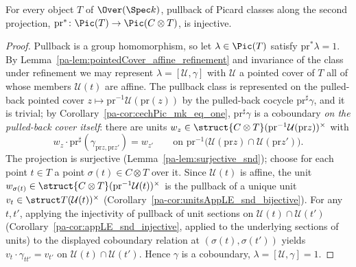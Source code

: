 \begin{theorem}
  \label{pa-thm:prPullback_injective}
  \leanok

  For every object \(T\) of \(\Over(\Spec k)\), pullback of Picard classes along the second
  projection, \(\mathrm{pr}^{*} \colon \Pic(T) \to \Pic(C \otimes T)\), is injective.
\end{theorem}
\begin{proof}
  \leanok
  Pullback is a group homomorphism, so let \(\lambda \in \Pic(T)\) satisfy
  \(\mathrm{pr}^{*}\lambda = 1\). By Lemma~\ref{pa-lem:pointedCover_affine_refinement} and
  invariance of the class under refinement we may represent \(\lambda = [\mathcal U, \gamma]\)
  with \(\mathcal U\) a pointed cover of \(T\) all of whose members \(\mathcal U(t)\) are
  affine. The pullback class is represented on the pulled-back pointed cover
  \(z \mapsto \mathrm{pr}^{-1}\mathcal U(\mathrm{pr}(z))\) by the pulled-back cocycle
  \(\mathrm{pr}^{\sharp}\gamma\), and it is trivial; by
  Corollary~\ref{pa-cor:cechPic_mk_eq_one}, \(\mathrm{pr}^{\sharp}\gamma\) is a coboundary
  \emph{on the pulled-back cover itself}: there are units
  \(w_z \in \struct{C \otimes T}(\mathrm{pr}^{-1}\mathcal U(\mathrm{pr} z))^{\times}\) with
  \[ w_z \cdot \mathrm{pr}^{\sharp}(\gamma_{\mathrm{pr}z, \mathrm{pr}z'}) = w_{z'}
     \qquad\text{on } \mathrm{pr}^{-1}\bigl(\mathcal U(\mathrm{pr}z) \cap
       \mathcal U(\mathrm{pr}z')\bigr). \]
  The projection is surjective (Lemma~\ref{pa-lem:surjective_snd}); choose for each point
  \(t \in T\) a point \(\sigma(t) \in C \otimes T\) over it. Since \(\mathcal U(t)\) is
  affine, the unit \(w_{\sigma(t)} \in
  \struct{C \otimes T}(\mathrm{pr}^{-1}\mathcal U(t))^{\times}\) is the pullback of a unique
  unit \(v_t \in \struct T(\mathcal U(t))^{\times}\)
  (Corollary~\ref{pa-cor:unitsAppLE_snd_bijective}). For any \(t, t'\), applying the injectivity
  of pullback of unit sections on \(\mathcal U(t) \cap \mathcal U(t')\)
  (Corollary~\ref{pa-cor:appLE_snd_injective}, applied to the underlying sections of units) to
  the displayed coboundary relation at \((\sigma(t), \sigma(t'))\) yields
  \(v_t \cdot \gamma_{t t'} = v_{t'}\) on \(\mathcal U(t) \cap \mathcal U(t')\). Hence
  \(\gamma\) is a coboundary, \(\lambda = [\mathcal U, \gamma] = 1\).
\end{proof}

